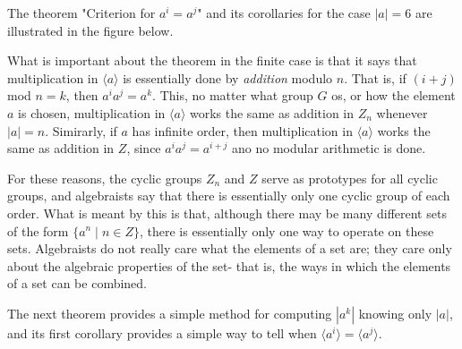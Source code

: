 \documentclass[12pt]{article}
\newcommand{\cent}[1]{\langle #1 \rangle}
\begin{document}
	The theorem "Criterion for $a^i = a^j$" and its corollaries for the case $|a| = 6$ are illustrated in the figure below.\newline
	
	What is important about the theorem in the finite case is that it says that multiplication in $\cent{a}$ is essentially done by \textit{addition} modulo $n$. That is, if $(i+j)$ mod $n = k$, then $a^ia^j = a^k$. This, no matter what group $G$ os, or how the element $a$ is chosen, multiplication in $\cent{a}$ works the same as addition in $Z_n$ whenever $|a| = n$. Simirarly, if $a$ has infinite order, then multiplication in $\cent{a}$ works the same as addition in $Z$, since $a^ia^j = a^{i+j}$ ano no modular arithmetic is done.\newline
	
	\begin{center}
	\end{center}
	
	For these reasons, the cyclic groups $Z_n$ and $Z$ serve as prototypes for all cyclic groups, and algebraists say that there is essentially only one cyclic group of each order. What is meant by this is that, although there may be many different sets of the form $\{ a^n \mid n \in Z \}$, there is essentially only one way to operate on these sets. Algebraists do not really care what the elements of a set are; they care only about the algebraic properties of the set- that is, the ways in which the elements of a set can be combined.\newline
	
	The next theorem provides a simple method for computing $|a^k|$ knowing only $|a|$, and its first corollary provides a simple way to tell when $\cent{a^i} = \cent{a^j}$.
\end{document}
